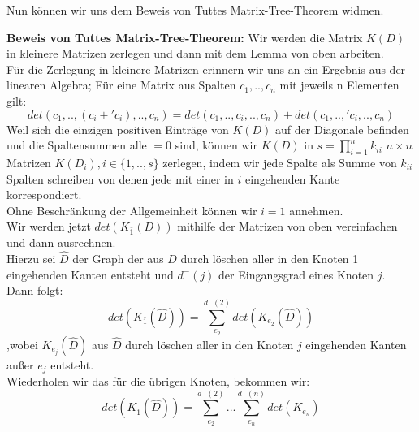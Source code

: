 Nun können wir uns dem Beweis von Tuttes Matrix-Tree-Theorem widmen.

\textbf{Beweis von Tuttes Matrix-Tree-Theorem:}
Wir werden die Matrix $K(D)$ in kleinere Matrizen zerlegen und dann mit dem Lemma von oben arbeiten.\\
Für die Zerlegung in kleinere Matrizen erinnern wir uns an ein Ergebnis aus der linearen Algebra;
Für eine Matrix aus Spalten $c_1,..,c_n$ mit jeweils n Elementen gilt:
\begin{equation}
 det(c_1,..,(c_i+\prime{c_i}),..,c_n) = det(c_1,..,c_i,..,c_n) + det(c_1,..,\prime{c_i},..,c_n)
\end{equation}
Weil sich die einzigen positiven Einträge von $K(D)$ auf der Diagonale befinden und die Spaltensummen alle $=0$ sind, können wir $K(D)$ in  $s=\prod_{i=1}^nk_{ii}$ $n \times n$ Matrizen $K(D_i), i\in\{1,..,s\}$ zerlegen, indem wir jede Spalte als Summe von $k_{ii}$ Spalten schreiben von denen jede mit einer in $i$ eingehenden Kante korrespondiert.\\
Ohne Beschränkung der Allgemeinheit können wir $i=1$ annehmen.\\
Wir werden jetzt $det(K_{\bar{1}}(D))$ mithilfe der Matrizen von oben vereinfachen und dann ausrechnen.\\
Hierzu sei $\hat{D}$ der Graph der aus $D$ durch löschen aller in den Knoten 1 eingehenden Kanten entsteht und $d^{-}(j)$ der Eingangsgrad eines Knoten $j$. Dann folgt:
\begin{equation}
 det(K_{\bar{1}}(\hat{D})) = \sum_{e_2}^{d^{-}(2)}det(K_{e_2}(\hat{D}))
\end{equation}
,wobei $K_{e_j}(\hat{D})$ aus $\hat{D}$ durch löschen aller in den Knoten $j$ eingehenden Kanten außer $e_j$ entsteht.\\
Wiederholen wir das für die übrigen Knoten, bekommen wir:
\begin{equation}
  det(K_{\bar{1}}(\hat{D})) = \sum_{e_2}^{d^{-}(2)}...\sum_{e_n}^{d^{-}(n)}det(K_{e_n})
\end{equation}
